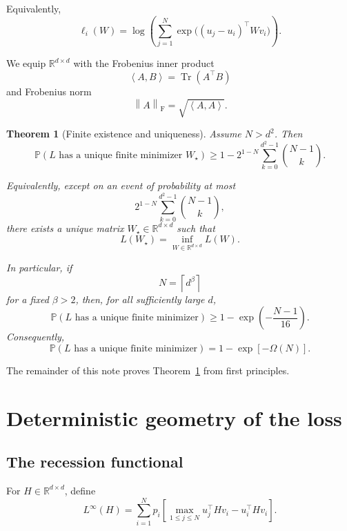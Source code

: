 \documentclass[11pt]{article}
\newtheorem{theorem}{Theorem}[section]
\newcommand{\R}{\mathbb{R}}
\newcommand{\F}{\mathrm{F}}
\newcommand{\ip}[2]{\left\langle #1,#2\right\rangle}
\newcommand{\norm}[1]{\left\lVert #1\right\rVert}
\newcommand{\Pp}{\mathbb{P}}
\newcommand{\1}{\mathbf{1}}
\begin{document}
Equivalently,
\begin{equation}
\ell_i(W)
=
\log\left(
\sum_{j=1}^{N}
\exp\bigl((u_j-u_i)^\top Wv_i\bigr)
\right).
\label{eq:relative-loss}
\end{equation}

We equip \(\R^{d\times d}\) with the Frobenius inner product
\[
\ip{A}{B}
=
\operatorname{Tr}(A^\top B)
\]
and Frobenius norm
\[
\norm{A}_{\F}
=
\sqrt{\ip{A}{A}}.
\]

\begin{theorem}[Finite existence and uniqueness]
\label{thm:main}
Assume \(N>d^2\). Then
\begin{equation}
\Pp\left(
L\text{ has a unique finite minimizer }W_\star
\right)
\ge
1-
2^{1-N}
\sum_{k=0}^{d^2-1}
\binom{N-1}{k}.
\label{eq:main-probability}
\end{equation}

Equivalently, except on an event of probability at most
\[
2^{1-N}
\sum_{k=0}^{d^2-1}
\binom{N-1}{k},
\]
there exists a unique matrix \(W_\star\in\R^{d\times d}\) such that
\[
L(W_\star)
=
\inf_{W\in\R^{d\times d}}L(W).
\]

In particular, if
\[
N=\left\lceil d^\beta\right\rceil
\]
for a fixed \(\beta>2\), then, for all sufficiently large \(d\),
\begin{equation}
\Pp\left(
L\text{ has a unique finite minimizer}
\right)
\ge
1-\exp\left(-\frac{N-1}{16}\right).
\label{eq:main-exponential}
\end{equation}
Consequently,
\[
\Pp\left(
L\text{ has a unique finite minimizer}
\right)
=
1-\exp[-\Omega(N)].
\]
\end{theorem}

The remainder of this note proves Theorem~\ref{thm:main} from first
principles.

\section{Deterministic geometry of the loss}

\subsection{The recession functional}

For \(H\in\R^{d\times d}\), define
\begin{equation}
L^\infty(H)
=
\sum_{i=1}^{N}p_i
\left[
\max_{1\le j\le N}u_j^\top Hv_i
-
u_i^\top Hv_i
\right].
\label{eq:recession}
\end{equation}
\end{document}
